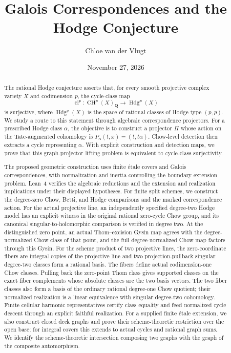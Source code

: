 \documentclass[11pt]{article}
\title{Galois Correspondences and the Hodge Conjecture}
\author{Chloe van der Vlugt}
\date{November 27, 2026}
\theoremstyle{definition}
\theoremstyle{remark}
\DeclareMathOperator{\CH}{CH}
\newcommand{\Q}{\mathbf Q}
\begin{document}
\maketitle

\begin{abstract}
The rational Hodge conjecture asserts that, for every smooth projective
complex variety \(X\) and codimension \(p\), the cycle-class map
\[
  \operatorname{cl}^p:\CH^p(X)_{\Q}
    \longrightarrow \operatorname{Hdg}^p(X)
\]
is surjective, where \(\operatorname{Hdg}^p(X)\) is the space of rational
classes of Hodge type \((p,p)\).  We study a route to this statement through
algebraic correspondence projectors.  For a prescribed Hodge class
\(\alpha\), the objective is to construct a projector \(\Pi\) whose action
on the Tate-augmented cohomology is
\(P_\alpha(t,x)=(t,t\alpha)\).  Chow-level detection then extracts a cycle
representing \(\alpha\).  With explicit construction and detection maps,
we prove that this graph-projector lifting problem is equivalent to
cycle-class surjectivity.

The proposed geometric construction uses finite \'{e}tale covers and Galois
correspondences, with normalization and inertia controlling the boundary
extension problem. Lean~4 verifies the algebraic reductions and the
extension and realization implications under their displayed hypotheses.  For finite split schemes, we construct the degree-zero
Chow, Betti, and Hodge comparisons and the marked correspondence action.
For the actual projective line, an independently specified degree-two Hodge
model has an explicit witness in the original rational zero-cycle Chow group,
and its canonical
singular-to-holomorphic comparison is verified in degree two. At the
distinguished zero point, an actual Thom--excision Gysin map agrees with the
degree-normalized Chow class of that point, and the full degree-normalized
Chow map factors through this Gysin. For the scheme
product of two projective lines, the zero-coordinate fibers are integral
copies of the projective line and two projection-pullback singular
degree-two classes form a rational basis. The fibers define actual
codimension-one Chow classes. Pulling back the zero-point Thom class gives
supported classes on the exact fiber complements whose absolute classes are
the two basis vectors. The two fiber classes also form a basis of the
ordinary rational degree-one Chow quotient; their normalized realization
is a linear equivalence with singular degree-two cohomology. Finite cellular
harmonic representatives certify class equality and feed normalized cycle
descent through an explicit faithful realization.
For a supplied finite \'{e}tale extension, we also construct closed deck
graphs and prove their scheme-theoretic restriction over the open base;
for integral covers this extends to actual cycles and rational graph sums.
We identify the scheme-theoretic intersection composing two graphs with
the graph of the composite automorphism.
\end{abstract}
\end{document}
